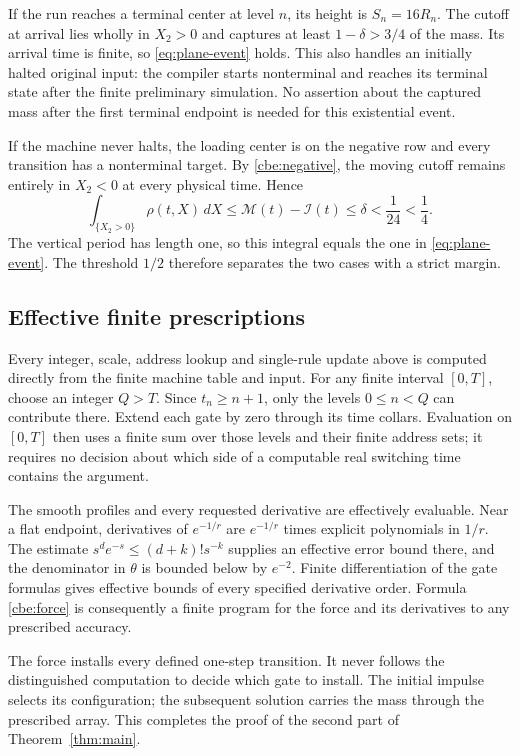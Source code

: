 If the run reaches a terminal center at level $n$, its height is
$S_n=16R_n$.  The cutoff at arrival lies wholly in $X_2>0$ and
captures at least $1-\delta>3/4$ of the mass.  Its arrival time is
finite, so \eqref{eq:plane-event} holds.  This also handles an initially
halted original input: the compiler starts nonterminal and reaches
its terminal state after the finite preliminary simulation.
No assertion about the captured mass after the first terminal
endpoint is needed for this existential event.

If the machine never halts, the loading center is on the negative
row and every transition has a nonterminal target.  By
\eqref{cbe:negative}, the moving cutoff remains entirely in
$X_2<0$ at every physical time.  Hence
\[
 \int_{\{X_2>0\}}\rho(t,X)\,dX
 \le\mathcal M(t)-\mathcal I(t)
 \le\delta<\frac1{24}<\frac14.
\]
The vertical period has length one, so this integral equals the
one in \eqref{eq:plane-event}.  The threshold $1/2$ therefore separates
the two cases with a strict margin.

\subsection{Effective finite prescriptions}
\label{cbe:effective}

Every integer, scale, address lookup and single-rule update above
is computed directly from the finite machine table and input.
For any finite interval $[0,T]$, choose an integer $Q>T$.
Since $t_n\ge n+1$, only the levels $0\le n<Q$ can contribute
there.  Extend each gate by zero through its time collars.  Evaluation
on $[0,T]$ then uses a finite sum over those levels and their finite
address sets; it requires no decision about which side of a
computable real switching time contains the argument.

The smooth profiles and every requested derivative are effectively
evaluable. Near a flat endpoint, derivatives of $e^{-1/r}$ are
$e^{-1/r}$ times explicit polynomials in $1/r$.  The estimate
$s^d e^{-s}\le(d+k)!s^{-k}$ supplies an effective error bound there,
and the denominator in $\theta$ is bounded below by $e^{-2}$.
Finite differentiation of the gate formulas gives effective
bounds of every specified derivative order.  Formula
\eqref{cbe:force} is consequently a finite program for the force
and its derivatives to any prescribed accuracy.

The force installs every defined one-step transition. It never follows
the distinguished computation to decide which gate to install. The
initial impulse selects its configuration; the subsequent solution
carries the mass through the prescribed array. This completes the
proof of the second part of Theorem~\ref{thm:main}.

